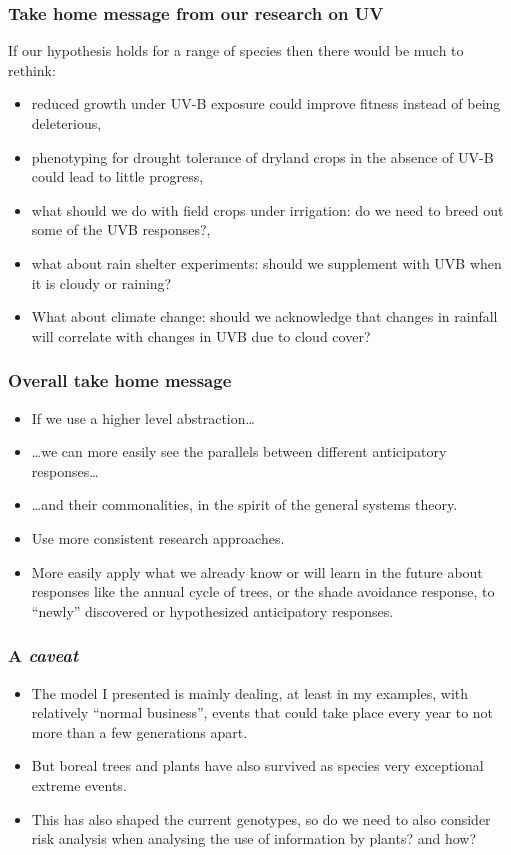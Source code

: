 \documentclass[10pt]{beamer}\usepackage[]{graphicx}\usepackage[]{color}
\begin{document}
\begin{frame}
  \frametitle{Take home message from our research on UV}
  If our hypothesis holds for a range of species then there would be much to rethink:
  \begin{itemize}
    \item reduced growth under UV-B exposure could improve fitness instead of being deleterious,
    \item phenotyping for drought tolerance of dryland crops in the absence of UV-B could lead to little progress,
    \item what should we do with field crops under irrigation: do we need to breed out some of the UVB responses?,
    \item what about rain shelter experiments: should we supplement with UVB when it is cloudy or raining?
    \item What about climate change: should we acknowledge that changes in rainfall will correlate with changes in UVB due to cloud cover?
  \end{itemize}
\end{frame}

\begin{frame}
  \frametitle{Overall take home message}
  \begin{itemize}
    \item If we use a higher level abstraction\ldots
    \item \ldots we can more easily see the parallels between different anticipatory responses\ldots
    \item \ldots and their commonalities, in the spirit of the general systems theory.
    \item Use more consistent research approaches.
    \item More easily apply what we already know or will learn in the future about responses like the annual cycle of trees, or the shade avoidance response, to ``newly'' discovered or hypothesized anticipatory responses.
  \end{itemize}
\end{frame}

\begin{frame}
  \frametitle{A \emph{caveat}}
  \begin{itemize}
    \item The model I presented is mainly dealing, at least in my examples, with relatively ``normal business'', events that could take place every year to not more than a few generations apart.
    \item But boreal trees and plants have also survived as species very exceptional extreme events.
    \item This has also shaped the current genotypes, so do we need to also consider risk analysis when analysing the use of information by plants? and how?
  \end{itemize}
\end{frame}
\end{document}
